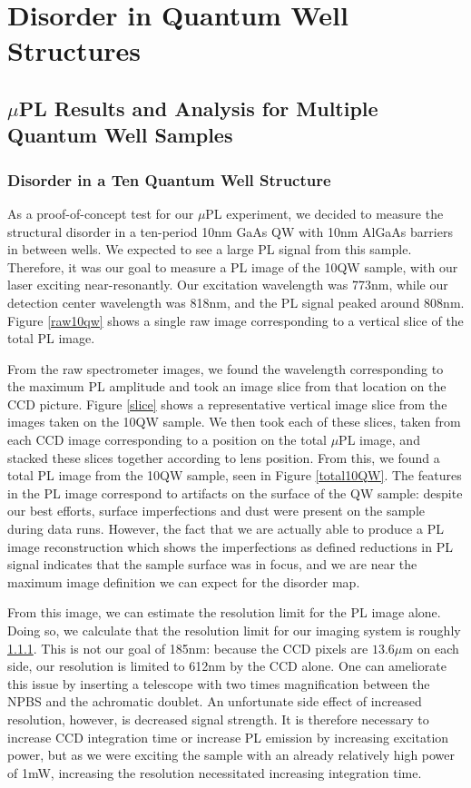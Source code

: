 \chapter{Disorder in Quantum Well Structures}

\section{$\mu$PL Results and Analysis for Multiple Quantum Well Samples}
\subsection{Disorder in a Ten Quantum Well Structure}
\indent As a proof-of-concept test for our $\mu$PL experiment, we decided to measure the structural disorder in a ten-period 10nm GaAs QW with 10nm AlGaAs barriers in between wells. We expected to see a large PL signal from this sample. Therefore, it was our goal to measure a PL image of the 10QW sample, with our laser exciting near-resonantly. Our excitation wavelength was 773nm, while our detection center wavelength was 818nm, and the PL signal peaked around 808nm. Figure \ref{raw10qw} shows a single raw image corresponding to a vertical slice of the total PL image. 

\indent From the raw spectrometer images, we found the wavelength corresponding to the maximum PL amplitude and took an image slice from that location on the CCD picture. Figure \ref{slice} shows a representative vertical image slice from the images taken on the 10QW sample. We then took each of these slices, taken from each CCD image corresponding to a position on the total $\mu$PL image, and stacked these slices together according to lens position. From this, we found a total PL image from the 10QW sample, seen in Figure \ref{total10QW}. The features in the PL image correspond to artifacts on the surface of the QW sample: despite our best efforts, surface imperfections and dust were present on the sample during data runs. However, the fact that we are actually able to produce a PL image reconstruction which shows the imperfections as defined reductions in PL signal indicates that the sample surface was in focus, and we are near the maximum image definition we can expect for the disorder map. 

\indent From this image, we can estimate the resolution limit for the PL image alone. Doing so, we calculate that the resolution limit for our imaging system is roughly \ref{}. This is not our goal of 185nm: because the CCD pixels are $13.6\mu$m on each side, our resolution is limited to 612nm by the CCD alone. One can ameliorate this issue by inserting a telescope with two times magnification between the NPBS and the achromatic doublet. An unfortunate side effect of increased resolution, however, is decreased signal strength. It is therefore necessary to increase CCD integration time or increase PL emission by increasing excitation power, but as we were exciting the sample with an already relatively high power of 1mW, increasing the resolution necessitated increasing integration time. 

